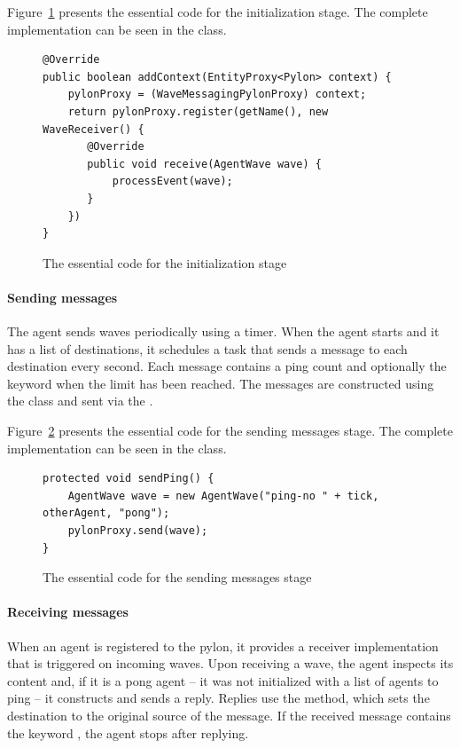 \documentclass{article}
\begin{document}
Figure~\ref{fig:func:initialization:code} presents the essential code for the initialization stage. The complete implementation can be seen in the  class.

\begin{figure}[ht]\centering
\begin{lstlisting}
@Override
public boolean addContext(EntityProxy<Pylon> context) {
    pylonProxy = (WaveMessagingPylonProxy) context;
    return pylonProxy.register(getName(), new WaveReceiver() {
	   @Override
	   public void receive(AgentWave wave) {
		   processEvent(wave);
	   }
    })
}
\end{lstlisting}
\caption{The essential code for the initialization stage}\label{fig:func:initialization:code}
\end{figure}

\paragraph{Sending messages}

The  agent sends waves periodically using a timer. When the agent starts and it has a list of destinations, it schedules a task that sends a message to each destination every second. Each message contains a ping count and optionally the keyword  when the limit has been reached. The messages are constructed using the  class and sent via the .

Figure~\ref{fig:func:sendPing:code} presents the essential code for the sending messages stage. The complete implementation can be seen in the  class.

\begin{figure}[ht]\centering
\begin{lstlisting}
protected void sendPing() {
    AgentWave wave = new AgentWave("ping-no " + tick, otherAgent, "pong");
    pylonProxy.send(wave);
}
\end{lstlisting}
\caption{The essential code for the sending messages stage}\label{fig:func:sendPing:code}
\end{figure}


\paragraph{Receiving messages} 

When an  agent is registered to the pylon, it provides a receiver implementation that is triggered on incoming waves. Upon receiving a wave, the agent inspects its content and, if it is a pong agent -- it was not initialized with a list of agents to ping -- it constructs and sends a reply. Replies use the  method, which sets the destination to the original source of the message. If the received message contains the keyword , the agent stops after replying.
\end{document}

